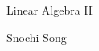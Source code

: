 \documentclass[linearalgebraII]{subfiles}
\begin{document}
    \begin{titlepage}
    \centering
    \vspace*{8cm}
    {\serifastd\Huge Linear Algebra II \par}
    \vspace{1cm}
    {\serifastd\Large Snochi Song\par}
    \vspace{2.5cm}
    \algebraicon
    \vspace*{\fill}
    \cleardoublepage
    \end{titlepage}

    \toc
\end{document}
